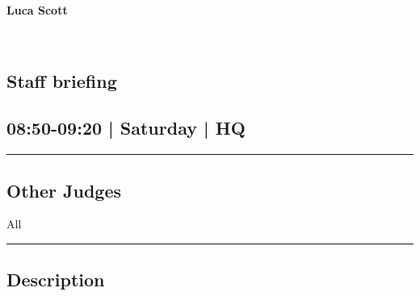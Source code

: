 \documentclass[10pt, A5]{article}
\newcommand{\newtitle}[1]{\begin{center}{\Huge\bfseries #1 }\\ \vspace{5mm}\end{center}}
\newcommand{\newsubtitle}[1]{\begin{center}{\color{grey}\Large\bfseries #1 }\\ \vspace{5mm}\end{center}}
\begin{document}
		\newtitle{Luca Scott}
	\newsubtitle{}



    
	
	
	
	
	
	
	
	
	
	
	
	
	
	

		\begin{framed}
			\begin{minipage}{\textwidth}

			\setcounter{section}{13}
							\section{Staff briefing}
						
			\subsection*{08:50-09:20 | Saturday | HQ}

			\vspace{0.25cm}
			\hrule
			\vspace{0.25cm}


			\subsection*{Other Judges}
							All

					\vspace{0.25cm}
			\hrule
			\vspace{0.25cm}

			\begin{minipage}{\textwidth}
			\subsection*{\faListAlt \: Description}
			
			\end{minipage}


	\end{minipage}
	\end{framed}

	
\end{document}
